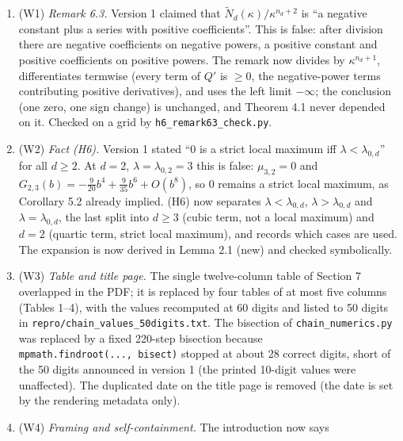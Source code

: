 \documentclass[
  11pt,
  a4paper,
]{article}
\providecommand{\tightlist}{%
  \setlength{\itemsep}{0pt}\setlength{\parskip}{0pt}}
\begin{document}
\begin{enumerate}
\def\labelenumi{\arabic{enumi}.}
\tightlist
\item
  (W1) \emph{Remark 6.3.} Version 1 claimed that
  \(\tilde N_d(\kappa)/\kappa^{n_d+2}\) is ``a negative constant plus a
  series with positive coefficients''. This is false: after division
  there are negative coefficients on negative powers, a positive
  constant and positive coefficients on positive powers. The remark now
  divides by \(\kappa^{n_d+1}\), differentiates termwise (every term of
  \(Q'\) is \(\ge0\), the negative-power terms contributing positive
  derivatives), and uses the left limit \(-\infty\); the conclusion (one
  zero, one sign change) is unchanged, and Theorem 4.1 never depended on
  it. Checked on a grid by {\small\texttt{h6\_\allowbreak{}remark63\_\allowbreak{}check.\allowbreak{}py}}.
\item
  (W2) \emph{Fact (H6).} Version 1 stated ``\(0\) is a strict local
  maximum iff \(\lambda<\lambda_{0,\allowbreak{}d}\)'' for all \(d\ge2\). At \(d=2\),
  \(\lambda=\lambda_{0,\allowbreak{}2}=3\) this is false: \(\mu_{3,\allowbreak{}2}=0\) and
  \(G_{2,\allowbreak{}3}(b)=-\frac9{20}b^4+\frac9{35}b^6+O(b^8)\), so \(0\) remains a
  strict local maximum, as Corollary 5.2 already implied. (H6) now
  separates \(\lambda<\lambda_{0,\allowbreak{}d}\), \(\lambda>\lambda_{0,\allowbreak{}d}\) and
  \(\lambda=\lambda_{0,\allowbreak{}d}\), the last split into \(d\ge3\) (cubic term,
  not a local maximum) and \(d=2\) (quartic term, strict local maximum),
  and records which cases are used. The expansion is now derived in
  Lemma 2.1 (new) and checked symbolically.
\item
  (W3) \emph{Table and title page.} The single twelve-column table of
  Section 7 overlapped in the PDF; it is replaced by four tables of at
  most five columns (Tables 1--4), with the values recomputed at 60
  digits and listed to 50 digits in
  {\small\texttt{repro/\allowbreak{}chain\_\allowbreak{}values\_\allowbreak{}50digits.\allowbreak{}txt}}. The bisection of
  {\small\texttt{chain\_\allowbreak{}numerics.\allowbreak{}py}} was replaced by a fixed 220-step bisection
  because
  \texttt{mpmath.findroot(...,\ \textquotesingle{}bisect\textquotesingle{})}
  stopped at about 28 correct digits, short of the 50 digits announced
  in version 1 (the printed 10-digit values were unaffected). The
  duplicated date on the title page is removed (the date is set by the
  rendering metadata only).
\item
  (W4) \emph{Framing and self-containment.} The introduction now says

\end{enumerate}
\end{document}

